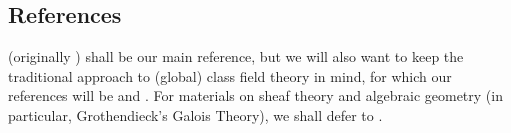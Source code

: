         \subsection{References}
    	    \cite{tendler_2015_geometric_class_field_theory} (originally \cite{tendler_2010_geometric_class_field_theory_original}) shall be our main reference, but we will also want to keep the traditional approach to (global) class field theory in mind, for which our references will be \cite[Chapter VI]{neukirch_2010_algebraic_number_theory} and \cite[Chapter VIII]{neukirch_1999_cohomology_of_number_field}. For materials on sheaf theory and algebraic geometry (in particular, Grothendieck's Galois Theory), we shall defer to \cite{stacks}. 
    	    
	\printbibliography

